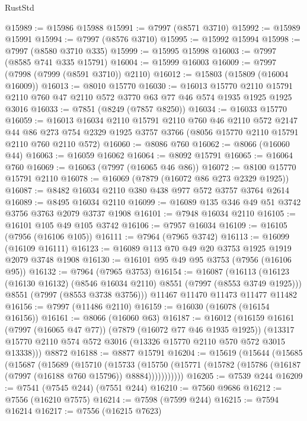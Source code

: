 \begin{lexlean}{RustStd}
\begin{coremodule}
{\begin{coremodule}
{{{{{{{{{{{{{{{{{{{{{{{{{{{{{{{{{{{{{{{{{{{@15989 := @15986 @15988
@15991 := @7997 (@8571 @3710)
@15992 := @15989 @15991
@15994 := @7997 (@8576 @3710)
@15995 := @15992 @15994
@15998 := @7997 (@8580 @3710 @335)
@15999 := @15995 @15998
@16003 := @7997 (@8585 @741 @335 @15791)
@16004 := @15999 @16003
@16009 := @7997 (@7998 (@7999 (@8591 @3710)) @2110)
@16012 := @15803 (@15809 (@16004 @16009))
@16013 := @8010 @15770
@16030 := @16013
    @15770
    @2110
    @15791
    @2110
    @760
    @47
    @2110
    @572
    @3770
    @63
    @77
    @46
    @574
    @1935
    @1925
    @1925
    @3016
@16033 := @7851 (@8249 (@7857 @8250))
@16034 := @16033 @15770
@16059 := @16013
    @16034
    @2110
    @15791
    @2110
    @760
    @46
    @2110
    @572
    @2147
    @44
    @86
    @273
    @754
    @2329
    @1925
    @3757
    @3766
    (@8056 @15770 @2110 @15791 @2110 @760 @2110 @572)
@16060 := @8086 @760
@16062 := @8066 (@16060 @44)
@16063 := @16059 @16062
@16064 := @8092 @15791
@16065 := @16064 @760
@16069 := @16063 (@7997 (@16065 @46 @86))
@16072 := @8100 @15770 @15791 @2110
@16078 := @16069 (@7879 (@16072 @86 @273 @2329 @1925))
@16087 := @8482 @16034 @2110 @380 @438 @977 @572 @3757 @3764 @2614
@16089 := @8495 @16034 @2110
@16099 := @16089 @135 @346 @49 @51 @3742 @3756 @3763 @2079 @3737 @1908
@16101 := @7948 @16034 @2110
@16105 := @16101 @105 @49 @105 @3742
@16106 := @7957 @16034
@16109 := @16105 (@7956 (@16106 @105))
@16111 := @7964 (@7965 @3742)
@16113 := @16099 (@16109 @16111)
@16123 := @16089 @113 @70 @49 @20 @3753 @1925 @1919 @2079 @3748 @1908
@16130 := @16101 @95 @49 @95 @3753 (@7956 (@16106 @95))
@16132 := @7964 (@7965 @3753)
@16154 := @16087
    (@16113
      (@16123 (@16130 @16132) (@8546 @16034 @2110) @8551 (@7997 (@8553 @3749 @1925)))
      @8551
      (@7997 (@8553 @3738 @3756)))
    @11467
    @11470
    @11473
    @11477
    @11482
@16156 := @7997 (@11486 @2110)
@16159 := @16030 (@16078 (@16154 @16156))
@16161 := @8066 (@16060 @63)
@16187 := @16012
    (@16159
      @16161
      (@7997 (@16065 @47 @77))
      (@7879 (@16072 @77 @46 @1935 @1925))
      (@13317 @15770 @2110 @574 @572 @3016 (@13326 @15770 @2110 @570 @572 @3015 @13338)))
    @8872
@16188 := @8877 @15791
@16204 := @15619
    (@15644
      (@15685
        (@15687
          (@15689
            (@15710
              (@15733
                (@15750
                  (@15771 (@15782 (@15786 (@16187 (@7997 (@16188 @760 @15796)) @8884)))))))))))
@16205 := @7539 @244
@16209 := @7541 (@7545 @244) (@7551 @244)
@16210 := @7560 @9686
@16212 := @7556 (@16210 @7575)
@16214 := @7598 (@7599 @244)
@16215 := @7594 @16214
@16217 := @7556 (@16215 @7623)
}}}}}}}}}}}}}}}}}}}}}}}}}}}}}}}}}}}}}}}}}}}
\end{coremodule}}
\end{coremodule}
\end{lexlean}
